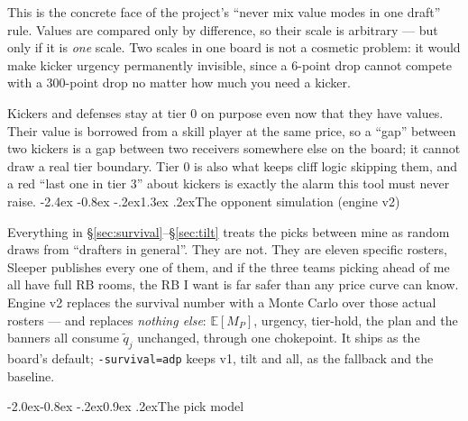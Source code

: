 \documentclass[10pt,a4paper]{article}
\makeatletter
\theoremstyle{plain}
\theoremstyle{definition}
\theoremstyle{remark}
\newcommand{\code}[1]{\texttt{\small #1}}
\renewcommand\section{\@startsection{section}{1}{\z@}%
  {-2.4ex \@plus -0.8ex \@minus -.2ex}{1.3ex \@plus.2ex}{\normalfont\Large\bfseries}}
\renewcommand\subsection{\@startsection{subsection}{2}{\z@}%
  {-2.0ex\@plus -0.8ex \@minus -.2ex}{0.9ex \@plus .2ex}{\normalfont\large\bfseries}}
\makeatother
\begin{document}
This is the concrete face of the project's ``never mix value modes in one draft'' rule.
Values are compared only by difference, so their scale is arbitrary --- but only if it is
\emph{one} scale. Two scales in one board is not a cosmetic problem: it would make kicker
urgency permanently invisible, since a $6$-point drop cannot compete with a $300$-point
drop no matter how much you need a kicker.

Kickers and defenses stay at tier $0$ on purpose even now that they have values. Their
value is borrowed from a skill player at the same price, so a ``gap'' between two kickers
is a gap between two receivers somewhere else on the board; it cannot draw a real tier
boundary. Tier $0$ is also what keeps cliff logic skipping them, and a red ``last one in
tier 3'' about kickers is exactly the alarm this tool must never raise.
\section{The opponent simulation (engine v2)}
\label{sec:sim}

Everything in \S\ref{sec:survival}--\S\ref{sec:tilt} treats the picks between mine as
random draws from ``drafters in general''. They are not. They are eleven specific rosters,
Sleeper publishes every one of them, and if the three teams picking ahead of me all have
full RB rooms, the RB I want is far safer than any price curve can know. Engine v2 replaces
the survival number with a Monte Carlo over those actual rosters --- and replaces
\emph{nothing else}: $\mathbb{E}[M_P]$, urgency, tier-hold, the plan and the banners all
consume $\tilde q_j$ unchanged, through one chokepoint. It ships as the board's default;
\code{-survival=adp} keeps v1, tilt and all, as the fallback and the baseline.

\subsection{The pick model}
\end{document}
